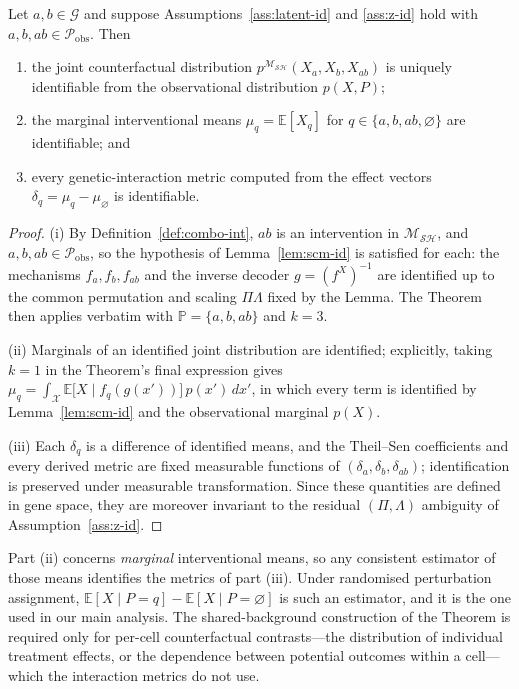 \begin{corollary}\label{cor:gi-id}
    Let $a, b \in \mathcal{G}$ and suppose Assumptions~\ref{ass:latent-id} and \ref{ass:z-id} hold
    with $a, b, ab \in \mathcal{P}_{\mathrm{obs}}$. Then
    \begin{enumerate}
        \item the joint counterfactual distribution $p^{\mathcal{M_{SH}}}(X_a, X_b, X_{ab})$ is
              uniquely identifiable from the observational distribution $p(X, P)$;
        \item the marginal interventional means $\mu_q = \mathbb{E}[X_q]$ for
              $q \in \{a, b, ab, \varnothing\}$ are identifiable; and
        \item every genetic-interaction metric computed from the effect vectors
              $\delta_q = \mu_q - \mu_{\varnothing}$ is identifiable.
    \end{enumerate}
\end{corollary}

\begin{proof}
    (i) By Definition~\ref{def:combo-int}, $ab$ is an intervention in $\mathcal{M_{SH}}$, and
    $a, b, ab \in \mathcal{P}_{\mathrm{obs}}$, so the hypothesis of Lemma~\ref{lem:scm-id} is
    satisfied for each: the mechanisms $f_a, f_b, f_{ab}$ and the inverse decoder
    $g = (f^X)^{-1}$ are identified up to the common permutation and scaling $\Pi\Lambda$ fixed by
    the Lemma. The Theorem then applies verbatim with $\mathbb{P} = \{a, b, ab\}$ and $k = 3$.

    (ii) Marginals of an identified joint distribution are identified; explicitly, taking $k = 1$ in
    the Theorem's final expression gives
    $\mu_q = \int_{\mathcal{X}} \mathbb{E}\big[X \mid f_q(g(x'))\big]\, p(x')\, dx'$, in which every
    term is identified by Lemma~\ref{lem:scm-id} and the observational marginal $p(X)$.

    (iii) Each $\delta_q$ is a difference of identified means, and the Theil--Sen coefficients and
    every derived metric are fixed measurable functions of $(\delta_a, \delta_b, \delta_{ab})$;
    identification is preserved under measurable transformation. Since these quantities are defined
    in gene space, they are moreover invariant to the residual $(\Pi, \Lambda)$ ambiguity of
    Assumption~\ref{ass:z-id}.
\end{proof}

\begin{remark}[Estimation]\label{rem:estimation}
    Part (ii) concerns \emph{marginal} interventional means, so any consistent estimator of those
    means identifies the metrics of part (iii). Under randomised perturbation assignment,
    $\mathbb{E}[X \mid P = q] - \mathbb{E}[X \mid P = \varnothing]$ is such an estimator, and it is
    the one used in our main analysis. The shared-background construction of the Theorem is required
    only for per-cell counterfactual contrasts---the distribution of individual treatment effects, or
    the dependence between potential outcomes within a cell---which the interaction metrics do not
    use.
\end{remark}

